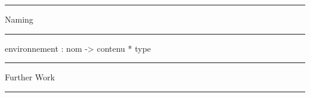 \documentclass[ignorenonframetext,red]{beamer}
\begin{document}
\hrule
\begin{frame}{Naming}
  
\end{frame}
\hrule

environnement : nom -> contenu * type

\hrule
\begin{frame}{Further Work}
  
\end{frame}
\hrule
\end{document}
